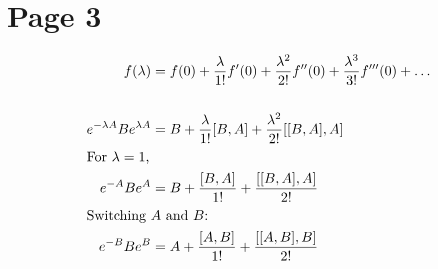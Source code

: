 \documentclass{report}
\begin{document}
\section*{Page 3}

\begin{align*}
f(\lambda) &= f(0) + \frac{\lambda}{1!} f'(0) + \frac{\lambda^2}{2!} f''(0) + \frac{\lambda^3}{3!} f'''(0) + \dots \\
\\
e^{-\lambda A} B e^{\lambda A} &= B + \frac{\lambda}{1!} [B,A] + \frac{\lambda^2}{2!} [[B,A],A] \\
\intertext{For $\lambda=1$,}
e^{-A} B e^{A} &= B + \frac{[B,A]}{1!} + \frac{[[B,A],A]}{2!} \\
\intertext{Switching $A$ and $B$:}
e^{-B} B e^{B} &= A + \frac{[A,B]}{1!} + \frac{[[A,B],B]}{2!} \\
\end{align*}
\end{document}
